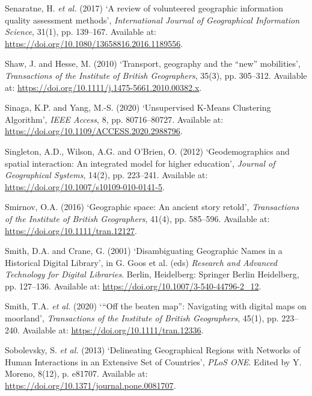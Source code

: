 \documentclass[
  letterpaper,
  11pt,
  english,
  onehalfspacing,
  headsepline]{MastersDoctoralThesis}
\newlength{\cslhangindent}
\newlength{\cslentryspacingunit} %
\newenvironment{CSLReferences}[2] %
 {%
  \setlength{\parindent}{0pt}
  \ifodd #1
  \let\oldpar\par
  \def\par{\hangindent=\cslhangindent\oldpar}
  \fi
  \setlength{\parskip}{#2\cslentryspacingunit}
 }%
 {}
\begin{document}
\begin{CSLReferences}{0}{0}
\leavevmode{}%
Senaratne, H. \emph{et al.} (2017) {`A review of volunteered geographic
information quality assessment methods'}, \emph{International Journal of
Geographical Information Science}, 31(1), pp. 139--167. Available at:
\url{https://doi.org/10.1080/13658816.2016.1189556}.

\leavevmode{}%
Shaw, J. and Hesse, M. (2010) {`Transport, geography and the {``new''}
mobilities'}, \emph{Transactions of the Institute of British
Geographers}, 35(3), pp. 305--312. Available at:
\url{https://doi.org/10.1111/j.1475-5661.2010.00382.x}.

\leavevmode{}%
Sinaga, K.P. and Yang, M.-S. (2020) {`Unsupervised {K-Means Clustering
Algorithm}'}, \emph{IEEE Access}, 8, pp. 80716--80727. Available at:
\url{https://doi.org/10.1109/ACCESS.2020.2988796}.

\leavevmode{}%
Singleton, A.D., Wilson, A.G. and O'Brien, O. (2012) {`Geodemographics
and spatial interaction: An integrated model for higher education'},
\emph{Journal of Geographical Systems}, 14(2), pp. 223--241. Available
at: \url{https://doi.org/10.1007/s10109-010-0141-5}.

\leavevmode{}%
Smirnov, O.A. (2016) {`Geographic space: An ancient story retold'},
\emph{Transactions of the Institute of British Geographers}, 41(4), pp.
585--596. Available at: \url{https://doi.org/10.1111/tran.12127}.

\leavevmode{}%
Smith, D.A. and Crane, G. (2001) {`Disambiguating {Geographic Names} in
a {Historical Digital Library}'}, in G. Goos et al. (eds) \emph{Research
and {Advanced Technology} for {Digital Libraries}}. {Berlin,
Heidelberg}: {Springer Berlin Heidelberg}, pp. 127--136. Available at:
\url{https://doi.org/10.1007/3-540-44796-2_12}.

\leavevmode{}%
Smith, T.A. \emph{et al.} (2020) {`{``{Off} the beaten map''}:
{Navigating} with digital maps on moorland'}, \emph{Transactions of the
Institute of British Geographers}, 45(1), pp. 223--240. Available at:
\url{https://doi.org/10.1111/tran.12336}.

\leavevmode{}%
Sobolevsky, S. \emph{et al.} (2013) {`Delineating {Geographical Regions}
with {Networks} of {Human Interactions} in an {Extensive Set} of
{Countries}'}, \emph{PLoS ONE}. Edited by Y. Moreno, 8(12), p. e81707.
Available at: \url{https://doi.org/10.1371/journal.pone.0081707}.


\end{CSLReferences}
\end{document}
